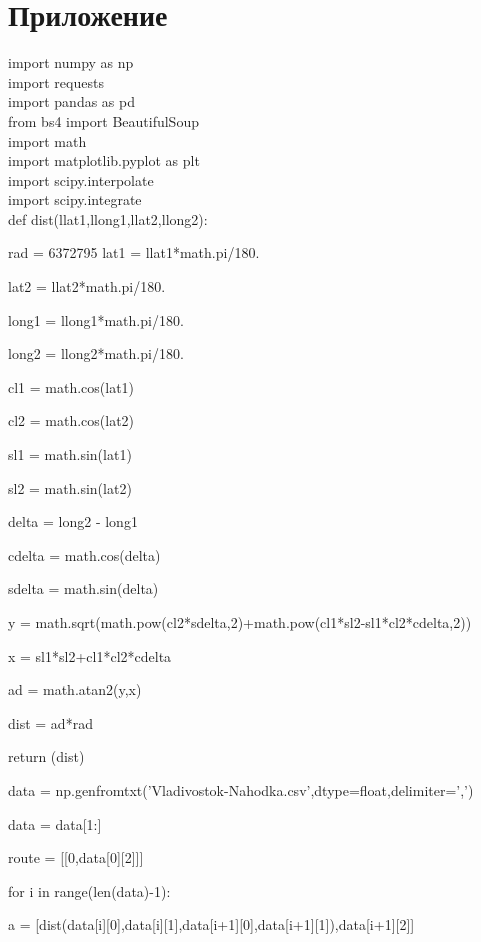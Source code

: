 \documentclass[A4paper,12pt]{article}
\theoremstyle{plain} %
\theoremstyle{definition} %
\theoremstyle{remark} %
\begin{document}
 \newpage
 \section*{Приложение}

 
\noindent import numpy as np\\
import requests\\
import pandas as pd\\
from bs4 import BeautifulSoup\\
import math\\
import matplotlib.pyplot as plt\\
import scipy.interpolate\\
import scipy.integrate\\

\noindent def dist(llat1,llong1,llat2,llong2):

    rad = 6372795
    lat1 = llat1*math.pi/180.
    
    lat2 = llat2*math.pi/180.
    
    long1 = llong1*math.pi/180.
    
    long2 = llong2*math.pi/180.
    
    cl1 = math.cos(lat1)
    
    cl2 = math.cos(lat2)
    
    sl1 = math.sin(lat1)
    
    sl2 = math.sin(lat2)
    
    delta = long2 - long1
    
    cdelta = math.cos(delta)
    
    sdelta = math.sin(delta)
    
    y = math.sqrt(math.pow(cl2*sdelta,2)+math.pow(cl1*sl2-sl1*cl2*cdelta,2))
    
    x = sl1*sl2+cl1*cl2*cdelta
    
    ad = math.atan2(y,x)
    
    dist = ad*rad
    
    return (dist)
    
    \noindent data  = np.genfromtxt('Vladivostok-Nahodka.csv',dtype=float,delimiter=',')
    
    \noindent data = data[1:]

    \noindent route = [[0,data[0][2]]]
    
    \noindent for i in range(len(data)-1):
    
    a = [dist(data[i][0],data[i][1],data[i+1][0],data[i+1][1]),data[i+1][2]]
    
\end{document}
